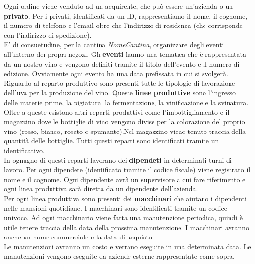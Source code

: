 Ogni ordine viene venduto ad un acquirente, che può essere un'azienda o un \textbf{privato}. Per i privati, identificati da un ID, rappresentiamo il nome, il cognome, il numero di telefono e l'email oltre che l'indirizzo di residenza (che corrisponde con l'indirizzo di spedizione).\\
E' di consuetudine, per la cantina \emph{NomeCantina}, organizzare degli eventi all'interno dei propri negozi. Gli \textbf{eventi} hanno una tematica che è rappresentata da un nostro vino e vengono definiti tramite il titolo dell'evento e il numero di edizione. Ovviamente ogni evento ha una data prefissata in cui si svolgerà.
Riguardo al reparto produttivo sono presenti tutte le tipologie di lavorazione dell'uva per la produzione del vino. Queste \textbf{linee produttive} sono l'ingresso delle materie prime, la pigiatura, la fermentazione, la vinificazione e la svinatura. Oltre a queste esistono altri reparti produttivi come l'imbottigliamento e il magazzino dove le bottiglie di vino vengono divise per la colorazione del proprio vino (rosso, bianco, rosato e spumante).Nel magazzino viene tenuto traccia della quantità delle bottiglie. Tutti questi reparti sono identificati tramite un identificativo.\\
In ognugno di questi reparti lavorano dei \textbf{dipendeti} in determinati turni di lavoro. Per ogni dipendete (identificato tramite il codice fiscale) viene registrato il nome e il cognome. Ogni dipendente avrà un supervisore a cui fare riferimento e ogni linea produttiva sarà diretta da un dipendente dell'azienda.\\
Per ogni linea produttiva sono presenti dei \textbf{macchinari} che aiutano i dipendenti nelle mansioni quotidiane. I macchinari sono identificati tramite un codice univoco. Ad ogni macchinario viene fatta una manutenzione periodica, quindi è utile tenere traccia della data della prossima manutenzione. I macchinari avranno anche un nome commerciale e la data di acquisto.\\
Le manutenzioni avranno un costo e verrano eseguite in una determinata data. Le manutenzioni vengono eseguite da aziende esterne rappresentate come sopra.